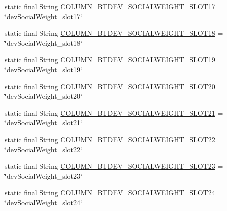 \begin{DoxyCompactItemize}
\item 
static final String \hyperlink{classcs_1_1nsense_1_1db_1_1_n_sense_s_q_lite_helper_a39e624085739d00cfec1244154401d95}{C\-O\-L\-U\-M\-N\-\_\-\-B\-T\-D\-E\-V\-\_\-\-S\-O\-C\-I\-A\-L\-W\-E\-I\-G\-H\-T\-\_\-\-S\-L\-O\-T17} = \char`\"{}dev\-Social\-Weight\-\_\-slot17\char`\"{}
\item 
static final String \hyperlink{classcs_1_1nsense_1_1db_1_1_n_sense_s_q_lite_helper_a7983ef2177f51a449da7b68a5343cc84}{C\-O\-L\-U\-M\-N\-\_\-\-B\-T\-D\-E\-V\-\_\-\-S\-O\-C\-I\-A\-L\-W\-E\-I\-G\-H\-T\-\_\-\-S\-L\-O\-T18} = \char`\"{}dev\-Social\-Weight\-\_\-slot18\char`\"{}
\item 
static final String \hyperlink{classcs_1_1nsense_1_1db_1_1_n_sense_s_q_lite_helper_ab0c1f50ed163bd3b4057a9e4ba57a056}{C\-O\-L\-U\-M\-N\-\_\-\-B\-T\-D\-E\-V\-\_\-\-S\-O\-C\-I\-A\-L\-W\-E\-I\-G\-H\-T\-\_\-\-S\-L\-O\-T19} = \char`\"{}dev\-Social\-Weight\-\_\-slot19\char`\"{}
\item 
static final String \hyperlink{classcs_1_1nsense_1_1db_1_1_n_sense_s_q_lite_helper_a121f5f29c559e58d1af9815678031c19}{C\-O\-L\-U\-M\-N\-\_\-\-B\-T\-D\-E\-V\-\_\-\-S\-O\-C\-I\-A\-L\-W\-E\-I\-G\-H\-T\-\_\-\-S\-L\-O\-T20} = \char`\"{}dev\-Social\-Weight\-\_\-slot20\char`\"{}
\item 
static final String \hyperlink{classcs_1_1nsense_1_1db_1_1_n_sense_s_q_lite_helper_a72d9ba1ef178bc4d32717e2347b39645}{C\-O\-L\-U\-M\-N\-\_\-\-B\-T\-D\-E\-V\-\_\-\-S\-O\-C\-I\-A\-L\-W\-E\-I\-G\-H\-T\-\_\-\-S\-L\-O\-T21} = \char`\"{}dev\-Social\-Weight\-\_\-slot21\char`\"{}
\item 
static final String \hyperlink{classcs_1_1nsense_1_1db_1_1_n_sense_s_q_lite_helper_a0e2d7e92cafb6c8c4cdbea690e508669}{C\-O\-L\-U\-M\-N\-\_\-\-B\-T\-D\-E\-V\-\_\-\-S\-O\-C\-I\-A\-L\-W\-E\-I\-G\-H\-T\-\_\-\-S\-L\-O\-T22} = \char`\"{}dev\-Social\-Weight\-\_\-slot22\char`\"{}
\item 
static final String \hyperlink{classcs_1_1nsense_1_1db_1_1_n_sense_s_q_lite_helper_a4025037f837af731eeef0e47967a0f21}{C\-O\-L\-U\-M\-N\-\_\-\-B\-T\-D\-E\-V\-\_\-\-S\-O\-C\-I\-A\-L\-W\-E\-I\-G\-H\-T\-\_\-\-S\-L\-O\-T23} = \char`\"{}dev\-Social\-Weight\-\_\-slot23\char`\"{}
\item 
static final String \hyperlink{classcs_1_1nsense_1_1db_1_1_n_sense_s_q_lite_helper_aa10b4323dffe120b65d76c52511d877f}{C\-O\-L\-U\-M\-N\-\_\-\-B\-T\-D\-E\-V\-\_\-\-S\-O\-C\-I\-A\-L\-W\-E\-I\-G\-H\-T\-\_\-\-S\-L\-O\-T24} = \char`\"{}dev\-Social\-Weight\-\_\-slot24\char`\"{}
\item 

\end{DoxyCompactItemize}
